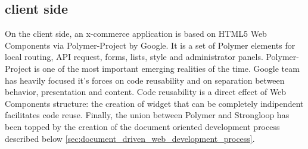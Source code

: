 \subsection{client side}
On the client side, an x-commerce application is based on HTML5 Web Components via Polymer-Project by Google. It is a set of Polymer elements for local routing, API request, forms, lists, style and administrator panels.
\newline
Polymer-Project is one of the most important emerging realities of the time. Google team has heavily focused it's forces on code reusability and on separation between behavior, presentation and content. Code reusability is a direct effect of Web Components structure: the creation of widget that can be completely indipendent facilitates code reuse.
\newline
Finally, the union between Polymer and Strongloop has been topped by the creation of the document oriented development process described below \ref{sec:document_driven_web_development_process}.